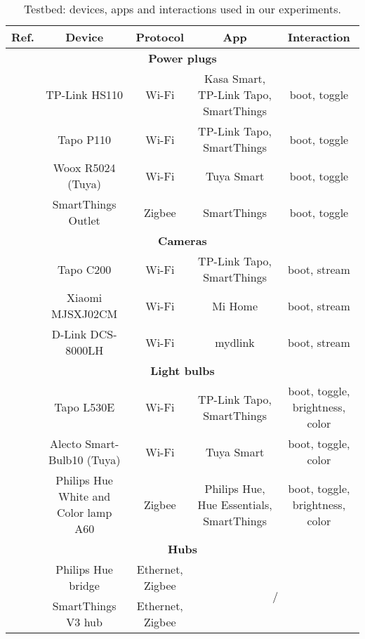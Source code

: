 \begin{table*}
  \centering
  \begin{tabular}{|c|c|c|c|c|}
  \hline
  \textbf{Ref.} & \textbf{Device} & \textbf{Protocol} & \textbf{App} & \textbf{Interaction}\\
  \hline
  \multicolumn{5}{|c|}{\textbf{Power plugs}} \\
  \hline
  \cite{hs110} & TP-Link HS110 & Wi-Fi & Kasa Smart, TP-Link Tapo, SmartThings & boot, toggle \\
  \hline
  \cite{tapo-p110} & Tapo P110 & Wi-Fi & TP-Link Tapo, SmartThings & boot, toggle \\
  \hline
  \cite{woox-plug} & Woox R5024 (Tuya) & Wi-Fi & Tuya Smart & boot, toggle \\
  \hline
  \cite{st-outlet} & SmartThings Outlet & Zigbee & SmartThings & boot, toggle \\
  \hline
  \multicolumn{5}{|c|}{\textbf{Cameras}} \\
  \hline
  \cite{tapo-c200} & Tapo C200 & Wi-Fi & TP-Link Tapo, SmartThings & boot, stream \\
  \hline
  \cite{xiaomi-cam} & Xiaomi MJSXJ02CM & Wi-Fi & Mi Home & boot, stream \\
  \hline
  \cite{dlink-cam} & D-Link DCS-8000LH & Wi-Fi & mydlink & boot, stream \\
  \hline
  \multicolumn{5}{|c|}{\textbf{Light bulbs}} \\
  \hline
  \cite{tapo-l530e} & Tapo L530E & Wi-Fi & TP-Link Tapo, SmartThings & boot, toggle, brightness, color\\
  \hline
  \cite{alecto-smart-bulb} & Alecto Smart-Bulb10 (Tuya) & Wi-Fi & Tuya Smart & boot, toggle, color \\
  \hline
  \cite{hue-lamp} & Philips Hue White and Color lamp A60 & Zigbee & Philips Hue, Hue Essentials, SmartThings & boot, toggle, brightness, color \\
  \hline
  \multicolumn{5}{|c|}{\textbf{Hubs}} \\
  \hline
  \cite{hue-bridge} & Philips Hue bridge & Ethernet, Zigbee & \multicolumn{2}{c|}{\multirow{2}{*}{/}} \\
  \cline{1-3}
  \cite{smartthings-hub} & SmartThings V3 hub & Ethernet, Zigbee & \multicolumn{2}{c|}{} \\
  \hline
  \end{tabular}
  \vspace{1mm}
  \caption{Testbed: devices, apps and interactions used in our experiments.}
  \label{tab:devices}
\end{table*}